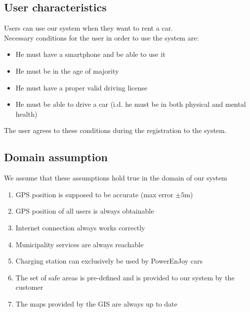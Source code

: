 \subsection{User characteristics}
	Users can use our system when they want to rent a car.\\
	Necessary conditions for the user in order to use the system are:
	\begin{itemize}
		\item He must have a smartphone and be able to use it
		\item He must be in the age of majority
		\item He must have a proper valid driving license
		\item He must be able to drive a car (i.d. he must be in both physical and mental health)
	\end{itemize}
	The user agrees to these conditions during the registration to the system.

\subsection{Domain assumption}
	We assume that these assumptions hold true in the domain of our system 
	\begin{enumerate}[label=\textbf{DA\arabic*}]
		\item GPS position is supposed to be accurate (max error $\pm5$m)
		\item GPS position of all users is always obtainable
		\item Internet connection always works correctly
		\item Municipality services are always reachable
		\item Charging station can exclusively be used by PowerEnJoy cars
		\item The set of safe areas is pre-defined and is provided to our system by the customer
		\item The maps provided by the GIS are always up to date
		
	\end{enumerate}
\clearpage